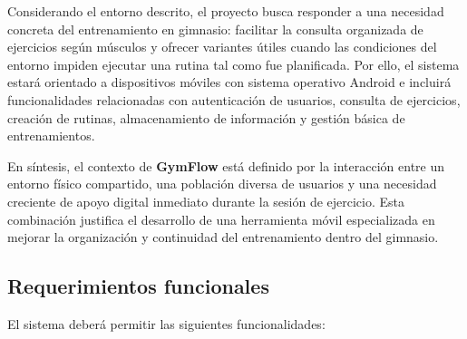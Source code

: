 Considerando el entorno descrito, el proyecto busca responder a una necesidad concreta del entrenamiento en gimnasio: facilitar la consulta organizada de ejercicios según músculos y ofrecer variantes útiles cuando las condiciones del entorno impiden ejecutar una rutina tal como fue planificada. Por ello, el sistema estará orientado a dispositivos móviles con sistema operativo Android e incluirá funcionalidades relacionadas con autenticación de usuarios, consulta de ejercicios, creación de rutinas, almacenamiento de información y gestión básica de entrenamientos.

En síntesis, el contexto de \textbf{GymFlow} está definido por la interacción entre un entorno físico compartido, una población diversa de usuarios y una necesidad creciente de apoyo digital inmediato durante la sesión de ejercicio. Esta combinación justifica el desarrollo de una herramienta móvil especializada en mejorar la organización y continuidad del entrenamiento dentro del gimnasio.
\subsection{Requerimientos funcionales}

El sistema deberá permitir las siguientes funcionalidades:

